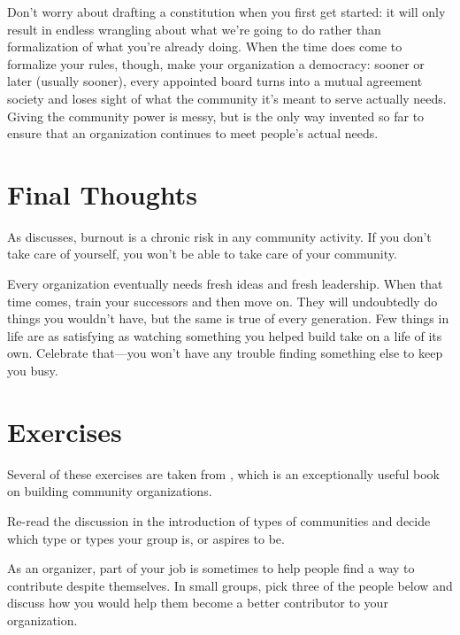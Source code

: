 Don't worry about drafting a constitution when you first get started: it
will only result in endless wrangling about what we're going to do
rather than formalization of what you're already doing. When the time
does come to formalize your rules, though, make your organization a
democracy: sooner or later (usually sooner), every appointed board turns
into a mutual agreement society and loses sight of what the community
it's meant to serve actually needs. Giving the community power is messy,
but is the only way invented so far to ensure that an organization
continues to meet people's actual needs.

\section{Final Thoughts}\label{s:community-final}

As \cite{Pign2016} discusses, burnout is a chronic risk in any
community activity. If you don't take care of yourself, you won't be
able to take care of your community.

Every organization eventually needs fresh ideas and fresh leadership.
When that time comes, train your successors and then move on. They will
undoubtedly do things you wouldn't have, but the same is true of every
generation. Few things in life are as satisfying as watching something
you helped build take on a life of its own. Celebrate that---you won't
have any trouble finding something else to keep you busy.

\section{Exercises}\label{s:community-exercises}

Several of these exercises are taken from \cite{Brow2007}, which is
an exceptionally useful book on building community organizations.


Re-read the discussion in the introduction of types of communities and
decide which type or types your group is, or aspires to be.


As an organizer, part of your job is sometimes to help people find a way
to contribute despite themselves. In small groups, pick three of the
people below and discuss how you would help them become a better
contributor to your organization.

